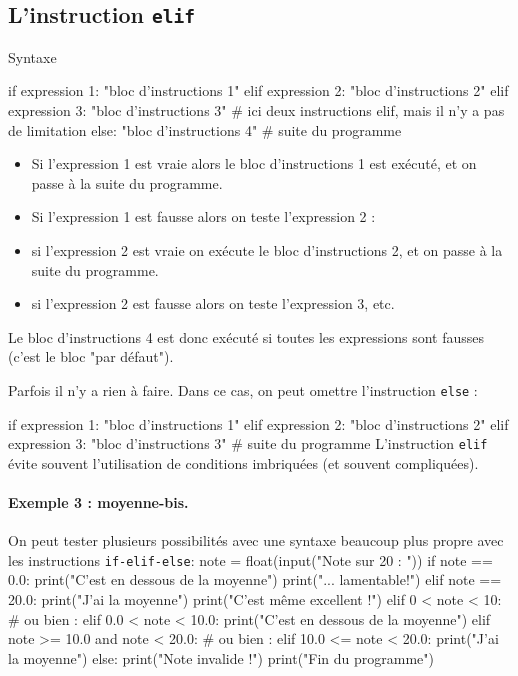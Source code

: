 \documentclass[%
oneside,                 %
final,                   %
10pt]{article}
\begin{document}
\subsection{L'instruction \texttt{elif} }
\begin{block}{Syntaxe }

\bpycod
if expression 1:
    "bloc d'instructions 1"
elif expression 2:
    "bloc d'instructions 2"
elif expression 3:
    "bloc d'instructions 3"    # ici deux instructions elif, mais il n'y a pas de limitation
else:
    "bloc d'instructions 4"
# suite du programme
\epycod
\begin{itemize}
\item Si l'expression 1 est vraie alors le bloc d'instructions 1 est exécuté, et on passe à la suite du programme.

\item Si l'expression 1 est fausse alors on teste l'expression 2 :

\item si l'expression 2 est vraie on exécute le bloc d'instructions 2, et on passe à la suite du programme.

\item si l'expression 2 est fausse alors on teste l'expression 3, etc.
\end{itemize}

\noindent
\end{block}
Le bloc d'instructions 4 est donc exécuté si toutes les expressions sont fausses (c'est le bloc "par défaut").

Parfois il n'y a rien à faire. Dans ce cas, on peut omettre l'instruction \texttt{else} :

\bpycod
if expression 1:
    "bloc d'instructions 1"
elif expression 2:
    "bloc d'instructions 2"
elif expression 3:
    "bloc d'instructions 3"
# suite du programme
\epycod
L'instruction \texttt{elif} évite souvent l'utilisation de conditions imbriquées (et souvent compliquées).

\paragraph{Exemple 3 : moyenne-bis.}
On peut tester plusieurs possibilités avec une syntaxe beaucoup plus propre avec les instructions \texttt{if-elif-else}:
\bpycod
note = float(input("Note sur 20 : "))
if note == 0.0:
    print("C'est en dessous de la moyenne")
    print("... lamentable!")
elif note == 20.0:
    print("J'ai la moyenne")
    print("C'est même excellent !")
elif 0 < note < 10:    # ou bien : elif 0.0 < note < 10.0:
    print("C'est en dessous de la moyenne")
elif note >= 10.0 and note < 20.0:   # ou bien : elif 10.0 <= note < 20.0:
    print("J'ai la moyenne")
else:
    print("Note invalide !")
print("Fin du programme")
\epycod
\end{document}
